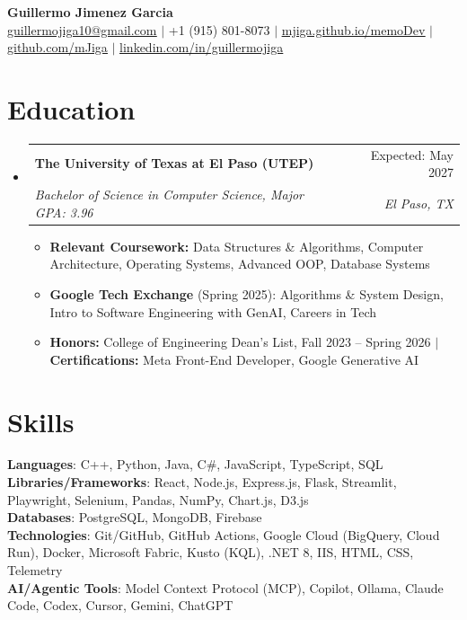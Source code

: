 \documentclass[letterpaper,10pt]{article}
\makeatletter
\newcommand{\resumeItem}[1]{\item\small{#1}}
\newcommand{\resumeSubheading}[4]{
  \item
    \begin{tabular*}{\textwidth}[t]{l@{\extracolsep{\fill}}r}
      \textbf{#1} & #2 \\
      \textit{\small#3} & \textit{\small #4} \\
    \end{tabular*}
}
\newcommand{\resumeSubHeadingListStart}
  {\begin{itemize}[leftmargin=0in, label={}, topsep=0pt, itemsep=5pt, parsep=0pt, partopsep=0pt]}
\newcommand{\resumeSubHeadingListEnd}{\end{itemize}}
\newcommand{\resumeItemListStart}
  {\begin{itemize}[leftmargin=0.17in, topsep=3pt, itemsep=2pt, parsep=0pt, partopsep=0pt]}
\newcommand{\resumeItemListEnd}{\end{itemize}}
\makeatother
\begin{document}
\begin{center}
    \textbf{\Huge Guillermo Jimenez Garcia} \\ \vspace{3pt}
    \small
    \href{mailto:guillermojiga10@gmail.com}{\underline{guillermojiga10@gmail.com}} $|$
    +1 (915) 801-8073 $|$
    \href{https://mjiga.github.io/memoDev/}{\underline{mjiga.github.io/memoDev}} $|$
    \href{https://github.com/mJiga}{\underline{github.com/mJiga}} $|$
    \href{https://www.linkedin.com/in/guillermojiga}{\underline{linkedin.com/in/guillermojiga}}
\end{center}

\section{Education}
  \resumeSubHeadingListStart
    \resumeSubheading
      {The University of Texas at El Paso (UTEP)}{Expected: May 2027}
      {Bachelor of Science in Computer Science, Major GPA: 3.96}{El Paso, TX}
      \resumeItemListStart
        \resumeItem{\textbf{Relevant Coursework:} Data Structures \& Algorithms, Computer Architecture, Operating Systems, Advanced OOP, Database Systems}
        \resumeItem{\textbf{Google Tech Exchange} (Spring 2025): Algorithms \& System Design, Intro to Software Engineering with GenAI, Careers in Tech}
        \resumeItem{\textbf{Honors:} College of Engineering Dean's List, Fall 2023 -- Spring 2026 $|$ \textbf{Certifications:} Meta Front-End Developer, Google Generative AI}
      \resumeItemListEnd
  \resumeSubHeadingListEnd

\section{Skills}
 \begin{itemize}[leftmargin=0in, label={}, topsep=0pt, parsep=0pt, partopsep=0pt]
    \small{\item{
     \textbf{Languages}{: C++, Python, Java, C\#, JavaScript, TypeScript, SQL} \\
     \textbf{Libraries/Frameworks}{: React, Node.js, Express.js, Flask, Streamlit, Playwright, Selenium, Pandas, NumPy, Chart.js, D3.js} \\
     \textbf{Databases}{: PostgreSQL, MongoDB, Firebase} \\
     \textbf{Technologies}{: Git/GitHub, GitHub Actions, Google Cloud (BigQuery, Cloud Run), Docker, Microsoft Fabric, Kusto (KQL), .NET 8, IIS, HTML, CSS, Telemetry} \\
     \textbf{AI/Agentic Tools}{: Model Context Protocol (MCP), Copilot, Ollama, Claude Code, Codex, Cursor, Gemini, ChatGPT}
    }}
 \end{itemize}
\end{document}
